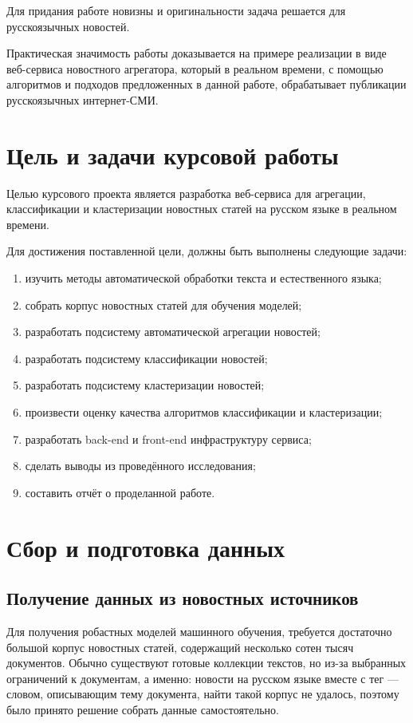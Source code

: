 \documentclass[a4paper, 14pt]{extarticle}
\begin{document}
Для придания работе новизны и оригинальности задача решается для русскоязычных новостей.

Практическая значимость работы доказывается на примере реализации в виде веб-сервиса новостного агрегатора,
который в реальном времени, с помощью алгоритмов и подходов предложенных в данной работе,
обрабатывает публикации русскоязычных интернет-СМИ.

\section{Цель и задачи курсовой работы}
Целью курсового проекта является разработка веб-сервиса для агрегации, классификации и
кластеризации новостных статей на русском языке в реальном времени.

Для достижения поставленной цели, должны быть выполнены следующие задачи:
\begin{enumerate}
	\item изучить методы автоматической обработки текста и естественного языка;
	\item собрать корпус новостных статей для обучения моделей;
	\item разработать подсистему автоматической агрегации новостей;
	\item разработать подсистему классификации новостей;
	\item разработать подсистему кластеризации новостей;
	\item произвести оценку качества алгоритмов классификации и кластеризации;
	\item разработать back-end и front-end инфраструктуру сервиса;
	\item сделать выводы из проведённого исследования;
	\item составить отчёт о проделанной работе.
\end{enumerate}

\section{Сбор и подготовка данных}
\subsection{Получение данных из новостных источников}
Для получения робастных моделей машинного обучения, требуется достаточно большой корпус новостных статей,
содержащий несколько сотен тысяч документов. Обычно существуют готовые коллекции текстов, но из-за выбранных 
ограничений к документам, а именно: новости на русском языке вместе с тег --- словом, описывающим тему 
документа, найти такой корпус не удалось, поэтому было принято решение собрать данные самостоятельно.
\end{document}
